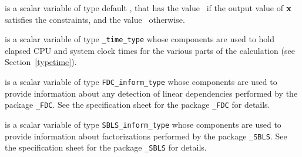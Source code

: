 \begin{description}
 is a scalar variable of type default \logical, that has the
value \true\ if the output value of ${\mathbf{x}}$ satisfies the constraints,
and the value \false\ otherwise.

 is a scalar variable of type {\tt \packagename\_time\_type} 
whose components are used to hold elapsed CPU and system clock times for the 
various parts of the calculation (see Section~\ref{typetime}).

 is a scalar variable of type 
{\tt FDC\_inform\_type}
whose components are used to provide information about 
any detection of linear dependencies
performed by the package 
{\tt \libraryname\_FDC}. 
See the specification sheet for the package 
{\tt \libraryname\_FDC} for details.

 is a scalar variable of type 
{\tt SBLS\_inform\_type}
whose components are used to provide information about factorizations
performed by the package 
{\tt \libraryname\_SBLS}. 
See the specification sheet for the package 
{\tt \libraryname\_SBLS} for details.

\end{description}
